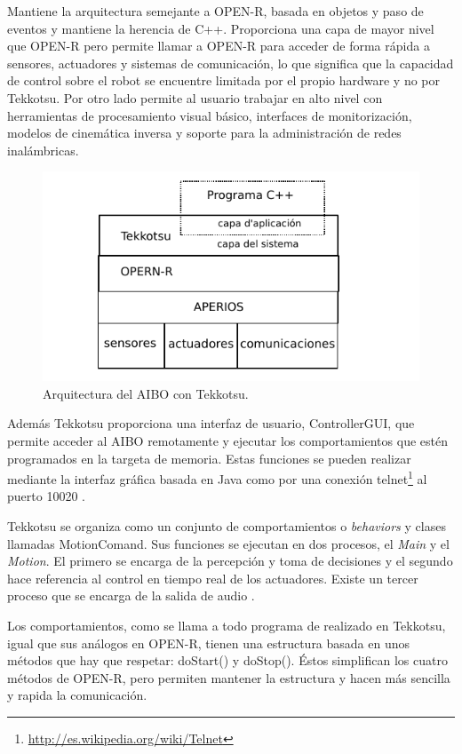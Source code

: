 \documentclass[12pt,a4paper,final,twoside]{book}
\begin{document}
Mantiene la arquitectura semejante a OPEN-R, basada en objetos y paso de eventos y mantiene la herencia de C++. Proporciona una capa de mayor nivel que OPEN-R pero permite llamar a OPEN-R para acceder de forma rápida a sensores, actuadores y sistemas de comunicación, lo que significa que la capacidad de control sobre el robot se encuentre limitada por el propio hardware y no por Tekkotsu. Por otro lado permite al usuario trabajar en alto nivel con herramientas de procesamiento visual básico, interfaces de monitorización, modelos de cinemática inversa y soporte para la administración de redes inalámbricas.
 
\begin{figure}[h!]
	\centering
    \includegraphics[scale=1.2]{images/tekk.pdf}
	 \caption{Arquitectura del AIBO con Tekkotsu.}
  \label{fig:tekk}
\end{figure}

Además Tekkotsu proporciona una interfaz de usuario, ControllerGUI, que permite acceder al AIBO remotamente y ejecutar los comportamientos que estén programados en la targeta de memoria. Estas funciones se pueden realizar mediante la interfaz gráfica basada en Java como por una conexión telnet\footnote{\url{http://es.wikipedia.org/wiki/Telnet}} al puerto 10020 \cite{TekkQuickRef}.

Tekkotsu se organiza como un conjunto de comportamientos o \textit{behaviors} y clases llamadas MotionComand. Sus funciones se ejecutan en dos procesos, el \textit{Main} y el \textit{Motion}. El primero se encarga de la percepción y toma de decisiones y el segundo hace referencia al control en tiempo real de los actuadores. Existe un tercer proceso que se encarga de la salida de audio \cite{tekkTut}. 

Los comportamientos, como se llama a todo programa de realizado en Tekkotsu, igual que sus análogos en OPEN-R, tienen una estructura basada en unos métodos que hay que respetar: doStart() y doStop(). Éstos simplifican los cuatro métodos de OPEN-R, pero permiten mantener la estructura y hacen más sencilla y rapida la comunicación.
  
\end{document}
